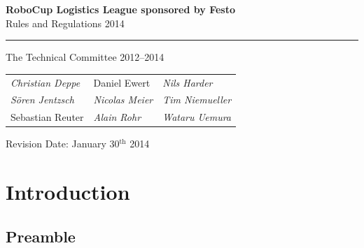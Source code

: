 \documentclass[12pt,twoside]{article}
\begin{document}


\begin{titlepage}
  \vspace*{5cm}
  \begin{center}
    \begin{LARGE}
      
      {\bf RoboCup Logistics League sponsored by Festo}\\[2ex]
      {\Large Rules and Regulations 2014}\\[4ex]
    \end{LARGE}
    \hrule
    
    {\LARGE\vspace*{4ex}}
    \begin{Large}
      The Technical Committee 2012--2014\\[6ex]
    \end{Large}
    \begin{tabular}{lll}
    \emph{Christian Deppe}&Daniel Ewert&\emph{Nils Harder}\\
    \emph{S\"oren Jentzsch}&\emph{Nicolas Meier}&\emph{Tim Niemueller}\\
      Sebastian Reuter&\emph{Alain Rohr}&\emph{Wataru Uemura}\\
    \end{tabular}
    \vfill
    Revision Date: January 30$^\mathrm{th}$ 2014
  \end{center}
\end{titlepage}
\thispagestyle{empty}
\pagebreak
\clearpage

\setcounter{page}{1}
\tableofcontents
\newpage
\cleardoublepage

\setcounter{page}{1}

\section{Introduction} \label{sec:intro}

\subsection*{Preamble} \label{sec:preamble}
\end{document}
